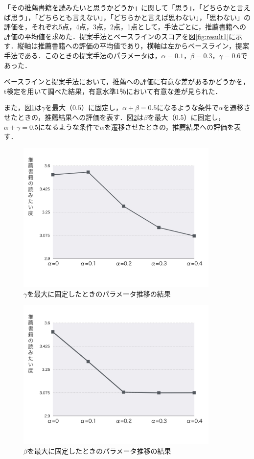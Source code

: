 \documentclass[a4paper,11pt,oneside,openany]{jsbook}
\begin{document}
「その推薦書籍を読みたいと思うかどうか」に関して「思う」，「どちらかと言えば思う」，「どちらとも言えない」，「どちらかと言えば思わない」，「思わない」の評価を，それぞれ5点，4点，3点，2点，1点として，手法ごとに，推薦書籍への評価の平均値を求めた．提案手法とベースラインのスコアを図\ref{fig:result1}に示す．縦軸は推薦書籍への評価の平均値であり，横軸は左からベースライン，提案手法である．このときの提案手法のパラメータは，$\alpha=0.1$，$\beta=0.3$，$\gamma=0.6$であった．
\par
ベースラインと提案手法において，推薦への評価に有意な差があるかどうかを，t検定を用いて調べた結果，有意水準1％において有意な差が見られた．
\par
また，図\ref{fig:result2}は$\gamma$を最大（$0.5$）に固定し，$\alpha+\beta=0.5$になるような条件で$\alpha$を遷移させたときの，推薦結果への評価を表す．図\ref{fig:result3}は$\beta$を最大（$0.5$）に固定し，$\alpha+\gamma=0.5$になるような条件で$\alpha$を遷移させたときの，推薦結果への評価を表す．
\begin{figure}[tb]
	\begin{center} %
		\includegraphics [width = 100mm] {figures/res_gamma.jpeg} %
	\end{center}
	\caption{$\gamma$を最大に固定したときのパラメータ推移の結果} %
	\label{fig:result2} %
\end{figure}
\begin{figure}[tb]
	\begin{center} %
		\includegraphics [width = 100mm] {figures/res_beta.jpeg} %
	\end{center}
	\caption{$\beta$を最大に固定したときのパラメータ推移の結果} %
	\label{fig:result3} %
\end{figure}
\end{document}
